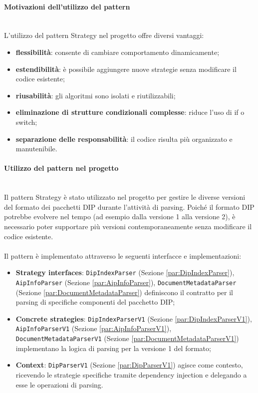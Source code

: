 \documentclass[a4paper,12pt]{article}
\begin{document}
{{{                \paragraph{Motivazioni dell’utilizzo del pattern}\mbox{}\\
                L’utilizzo del pattern Strategy nel progetto offre diversi vantaggi:
                \begin{itemize}
                    \item \textbf{flessibilità}: consente di cambiare comportamento dinamicamente;
                    \item \textbf{estendibilità}: è possibile aggiungere nuove strategie senza modificare il codice esistente;
                    \item \textbf{riusabilità}: gli algoritmi sono isolati e riutilizzabili;
                    \item \textbf{eliminazione di strutture condizionali complesse}: riduce l’uso di if o switch;
                    \item \textbf{separazione delle responsabilità}: il codice risulta più organizzato e manutenibile.
                \end{itemize}
                
                \paragraph{ Utilizzo del pattern nel progetto}\mbox{}\\
                Il pattern Strategy è stato utilizzato nel progetto per gestire le diverse versioni del formato dei pacchetti DIP durante l'attività di parsing. Poiché il formato DIP potrebbe evolvere nel tempo (ad esempio dalla versione 1 alla versione 2), è necessario poter supportare più versioni contemporaneamente senza modificare il codice esistente.\\
                \\
                Il pattern è implementato attraverso le seguenti interfacce e implementazioni:
                \begin{itemize}
                    \item \textbf{Strategy interfaces}: \texttt{DipIndexParser} (Sezione \ref{par:DipIndexParser}), \texttt{AipInfoParser} (Sezione \ref{par:AipInfoParser}), \texttt{DocumentMetadataParser} (Sezione \ref{par:DocumentMetadataParser}) definiscono il contratto per il parsing di specifiche componenti del pacchetto DIP;
                    \item \textbf{Concrete strategies}: \texttt{DipIndexParserV1} (Sezione \ref{par:DipIndexParserV1}), \texttt{AipInfoParserV1} (Sezione \ref{par:AipInfoParserV1}), \texttt{DocumentMetadataParserV1} (Sezione \ref{par:DocumentMetadataParserV1}) implementano la logica di parsing per la versione 1 del formato;
                    \item \textbf{Context}: \texttt{DipParserV1} (Sezione \ref{par:DipParserV1}) agisce come contesto, ricevendo le strategie specifiche tramite dependency injection e delegando a esse le operazioni di parsing.
                \end{itemize}
                
}}}
\end{document}
